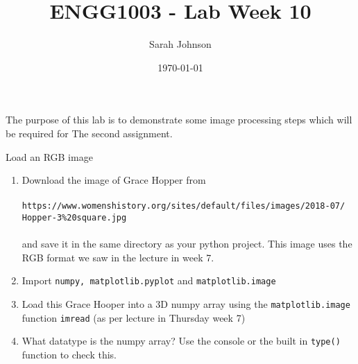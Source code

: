 \documentclass{lab}
\title{ENGG1003 - Lab Week 10}
\author{Sarah Johnson}
\date{\today}
\begin{document}
\maketitle

The purpose of this lab is to demonstrate some image processing steps which will be required for The second assignment.

\begin{task}{Load an RGB image}{}


\begin{enumerate}
\item Download the image of Grace Hopper from \\~\\ \texttt{https://www.womenshistory.org/sites/default/files/images/2018-07/} \texttt{Hopper-3\%20square.jpg} \\~\\
and save it in the same directory as your python project. This image uses the RGB format we saw in the lecture in week 7.
\item Import \texttt{numpy, matplotlib.pyplot} and \texttt{matplotlib.image}
\item Load this Grace Hooper into a 3D numpy array using the \texttt{matplotlib.image} function \texttt{imread} (as per lecture in Thursday week 7)
\item 	What datatype is the numpy array? Use the console or the built in \texttt{type()} function to check this.
\end{enumerate}
\end{task}
\end{document}
